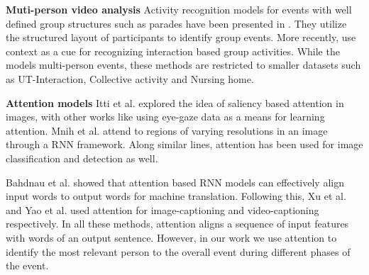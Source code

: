 
\noindent \textbf{Muti-person video analysis}
Activity recognition models for events with well defined group structures such
as parades have been presented in
\cite{Vaswani_CVPR03,Intille_CVIU01,Moore_AAAI02,Khan_ACM05}.  They utilize the
structured layout of participants to identify group events. More
recently, \cite{Lan_PAMI12,Choi_ICCV09,Khodabandeh_arxiv15} use context as a
cue for recognizing interaction based group activities.  While the models
multi-person events, these methods are restricted to smaller
datasets such as UT-Interaction\cite{Ryoo_10}, Collective activity
\cite{Choi_ICCV09} and Nursing home\cite{Lan_PAMI12}.

\noindent \textbf{Attention models}
Itti et al. \cite{Itti_PAMI98} explored the idea of saliency based attention in
images, with other works like \cite{Shapovalova_NIPS13} using eye-gaze data as
a means for learning attention.  Mnih et al. \cite{Mnih_NIPS14} attend to
regions of varying resolutions in an image through a RNN framework.  Along
similar lines, attention has been used for image classification
\cite{Cao_ICCV15,Gregor_arxiv15,Xiao_arxiv14} and detection
\cite{Ba_arxiv14,Caicedo_ICCV15,Yoo_arxiv15} as well.

Bahdnau et al. \cite{Bahdnau_arxiv14} showed that attention based RNN models
can effectively align input words to output words for machine translation.
Following this, Xu et al. \cite{Xu_arxiv15} and Yao et al. \cite{Yao_arxiv15}
used attention for image-captioning and video-captioning respectively.
In all these methods,
attention aligns a sequence of input features with words of an output sentence.
However, in our work we use attention to identify the most relevant person to
the overall event during different phases of the event.

